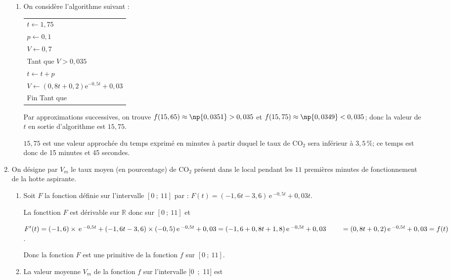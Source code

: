 \documentclass[10pt]{article}
\newcommand{\R}{\mathbb{R}}
\newcommand{\e}{\mathrm{\,e\,}}%
\begin{document}
\begin{enumerate}
\begin{enumerate}
		\item  On considère l'algorithme suivant :
		
\begin{center}
\begin{tabularx}{0.5\linewidth}{|X|}\hline
$t \gets 1,75$\\
$p \gets 0,1$\\
$V \gets 0,7$\\
Tant que $V > 0,035$\\
\hspace{0.75cm}$t \gets t + p$\\
\hspace{0.75cm}$V \gets (0,8t + 0,2)\text{e}^{-0,5t} + 0,03$\\
Fin Tant que\\ \hline
\end{tabularx}
\end{center}		
		
	
Par approximations successives, on trouve $f(15,65) \approx \np{0,0351} > 0,035$ et $f(15,75) \approx \np{0,0349} < 0,035$; donc la valeur de $t$ en sortie d'algorithme est $15,75$.

$15,75$ est une valeur approchée du temps exprimé en minutes à partir duquel le taux de CO$_2$ sera inférieur à $3,5\,\%$; ce temps est donc de 15 minutes et 45 secondes.
		
 	\end{enumerate}
\item  On désigne par $V_m$ le taux moyen (en pourcentage) de CO$_2$ présent dans le local pendant les $11$
premières minutes de fonctionnement de la hotte aspirante.
	\begin{enumerate}
		\item Soit $F$ la fonction définie sur l'intervalle $[0~;~11]$ par : 
$F(t) = (-1,6t -3,6)\e^{-0,5t} +0,03t$.
		
La foncttion $F$ est dérivable sur $\R$ donc sur $[0~;~11]$ et

$F'(t)=(-1,6) \times \e^{-0,5t} + (-1,6t-3,6) \times (-0,5)\e^{-0,5t} + 0,03
= (-1,6 +0,8t + 1,8)\e^{-0,5t} + 0,03\\
\phantom{F'(t)}
= (0,8t + 0,2) \e^{-0,5t} + 0,03 = f(t)$.

Donc la fonction $F$ est une primitive de la fonction $f$ sur $[0~;~11]$.
		
		\item La  valeur moyenne $V_m$ de la fonction $f$ sur l'intervalle [0~;~11] est
		

\end{enumerate}
\end{enumerate}
\end{document}
